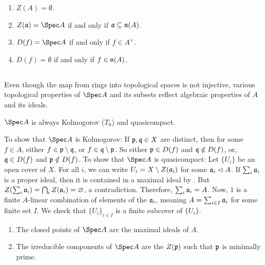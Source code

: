 \documentclass[10pt,final,oneside]{amsbook}
\makeatletter
\renewenvironment{proof}[1][\proofname] 
{ 	
	\par\pushQED{\qed}\normalfont\topsep6\p@\@plus6\p@\relax\trivlist\itemindent\normalparindent
	\item[\hskip\labelsep\itshape#1\@addpunct{.}]\ignorespaces
}
{
	\popQED\endtrivlist\@endpefalse
}
\numberwithin{equation}{section}
\makeatother
\begin{document}
\begin{cor}\label{EmptyOrAll}\mbox{}
\begin{enumerate}
\item 	$Z(A) = \emptyset$.
\item 	$Z(\fr{a}) = \Spec A$ if and only if $\mathfrak{a} \subseteq \mathfrak{n}(A)$.
\item 	$D(f) = \Spec A$ if and only if $f \in A^\times$.
\item 	$D(f) = \emptyset$ if and only if $f \in \mathfrak{n}(A)$.
\end{enumerate}
\end{cor}

\subsection{}

Even though the map from rings into topological spaces is not injective, various topological properties of $\Spec A$ and its subsets reflect algebraic properties of $A$ and its ideals.

\begin{prop}
$\Spec A$ is always Kolmogorov ($T_0$) and quasicompact.
\end{prop}

\begin{proof}
To show that $\Spec A$ is Kolmogorov:
If $\mathfrak{p}, \mathfrak{q} \in X$ are distinct, then for some $f \in A$, either $f \in \mathfrak{p} \setminus \mathfrak{q}$, or $f \in \mathfrak{q}\setminus \mathfrak{p}$.
So either $\mathfrak{p} \in D(f)$ and $\mathfrak{q} \notin D(f)$, or, $\mathfrak{q} \in D(f)$ and $\mathfrak{p} \notin D(f)$.
To show that $\Spec A$ is quasicompact:
Let $\{U_i\}$ be an open cover of $X$.
For all $i$, we can write $U_i = X \setminus Z(\mathfrak{a}_i)$ for some $\mathfrak{a}_i \vartriangleleft A$.
If $\sum_i \mathfrak{a}_i$ is a proper ideal, then it is contained in a maximal ideal by \cite[Cor.~1.4]{AM}.
But $Z(\sum_i \mathfrak{a}_i) = \bigcap_i Z(\mathfrak{a}_i) = \varnothing$, a contradiction.
Therefore, $\sum_i \mathfrak{a}_i = A$.
Now, $1$ is a finite $A$-linear combination of elements of the $\mathfrak{a}_i$, meaning $A = \sum_{i \in I} \mathfrak{a}_i$ for some finite set $I$.
We check that $\{U_i\}_{i \in I}$ is a finite subcover of $\{U_i\}$.
\end{proof}

\begin{prop}\label{MaxMinPrime}\mbox{}
\begin{enumerate}
\item 	The closed points of $\Spec A$ are the maximal ideals of $A$.
\item 	The irreducible components of $\Spec A$ are the $Z(\mathfrak{p})$ such that $\mathfrak{p}$ is minimally prime.
\end{enumerate}
\end{prop}
\end{document}
